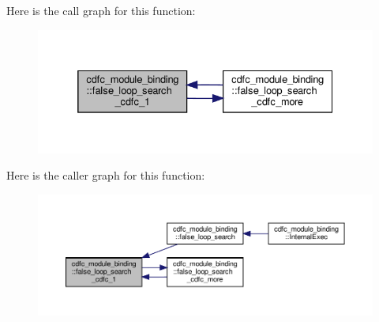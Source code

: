 Here is the call graph for this function\+:
\nopagebreak
\begin{figure}[H]
\begin{center}
\leavevmode
\includegraphics[width=332pt]{d9/dc4/classcdfc__module__binding_a4979eecd53066cce0234ab4d42bca3a0_cgraph}
\end{center}
\end{figure}
Here is the caller graph for this function\+:
\nopagebreak
\begin{figure}[H]
\begin{center}
\leavevmode
\includegraphics[width=350pt]{d9/dc4/classcdfc__module__binding_a4979eecd53066cce0234ab4d42bca3a0_icgraph}
\end{center}
\end{figure}
\mbox{\label{classcdfc__module__binding_a8bc1294bc28ba788416147655ac1d17c}} 
